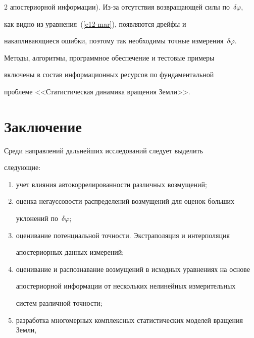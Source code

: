 \begin{multicols}{2}
апостериорной информации). Из-за отсутствия возвращающей силы по~$\delta \varphi$, 


как видно из уравнения~(\ref{e12-mar}), появляются дрейфы и


накапливающиеся ошибки,  поэтому так необходимы точные измерения~$\delta \varphi$.





Методы, алгоритмы, программное обеспечение и тестовые примеры


включены в состав информационных ресурсов по фундаментальной


проблеме <<Статистическая динамика вращения Земли>>.





\section{Заключение}





Среди направлений дальнейших исследований следует выделить


следующие:


\begin{enumerate}[(1)]


\item учет влияния автокоррелированности различных возмущений;


\item


оценка негауссовости распределений возмущений для оценок больших


уклонений по~$\delta \varphi$;


\item


оценивание потенциальной точности. Экстраполяция и интерполяция


апостериорных данных измерений;


\item


оценивание и распознавание возмущений в исходных уравнениях на основе


апостериорной информации от нескольких нелинейных измерительных


сис\-тем различной точности;


\item


разработка многомерных  комплексных статистических моделей вращения Земли,



\end{enumerate}
\end{multicols}
